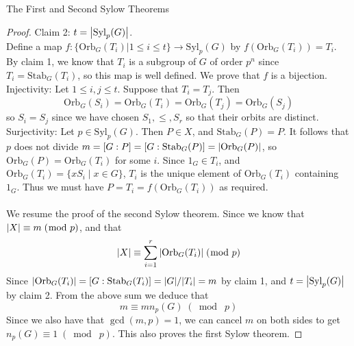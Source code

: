 \documentclass[a4paper]{article}
\begin{document}
\begin{thm}{The First and Second Sylow Theorems}{}
\begin{proof}
Claim 2: $t=\abs{\text{Syl}_p(G)}$. \\
Define a map $f:\{\text{Orb}_G(T_i)|1\leq i\leq t\}\to\text{Syl}_p(G)$ by $f(\text{Orb}_G(T_i))=T_i$. By claim 1, we know that $T_i$ is a subgroup of $G$ of order $p^n$ since $T_i=\text{Stab}_G(T_i)$, so this map is well defined. We prove that $f$ is a bijection. \\
Injectivity: Let $1\leq i,j\leq t$. Suppose that $T_i=T_j$. Then $$\text{Orb}_G(S_i)=\text{Orb}_G(T_i)=\text{Orb}_G(T_j)=\text{Orb}_G(S_j)$$ so $S_i=S_j$ since we have chosen $S_1,\leq,S_r$ so that their orbits are distinct. \\
Surjectivity: Let $p\in\text{Syl}_p(G)$. Then $P\in X$, and $\text{Stab}_G(P)=P$. It follows that $p$ does not divide $m=[G:P]=[G:\text{Stab}_G(P)]=\abs{\text{Orb}_G(P)}$, so $\text{Orb}_G(P)=\text{Orb}_G(T_i)$ for some $i$. Since $1_G\in T_i$, and $\text{Orb}_G(T_i)=\{xS_i\;|\;x\in G\}$, $T_i$ is the unique element of $\text{Orb}_G(T_i)$ containing $1_G$. Thus we must have $P=T_i=f(\text{Orb}_G(T_i))$ as required. \\~\\

We resume the proof of the second Sylow theorem. Since we know that $\abs{X}\equiv m\;(\bmod\;p)$, and that $$\abs{X}\equiv\sum_{i=1}^r\abs{\text{Orb}_G(T_i)}\;(\bmod\;p)$$ Since $\abs{\text{Orb}_G(T_i)}=[G:\text{Stab}_G(T_i)]=\abs{G}/\abs{T_i}=m$ by claim 1, and $t=\abs{\text{Syl}_p(G)}$ by claim 2. From the above sum we deduce that $$m\equiv mn_p(G)\;(\bmod\;p)$$ Since we also have that $\gcd(m,p)=1$, we can cancel $m$ on both sides to get $n_p(G)\equiv1\;(\bmod\;p)$. This also proves the first Sylow theorem. 
\end{proof}
\end{thm}
\end{document}
